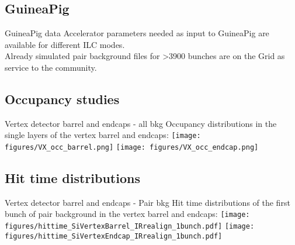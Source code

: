 \documentclass[xcolor={dvipsnames}]{beamer}
\begin{document}
\subsection{GuineaPig}
\begin{frame}{GuineaPig data}
Accelerator parameters needed as input to GuineaPig are available for different ILC modes.\\
Already simulated pair background files for >3900 bunches are on the Grid as service to the community.\cite{Grid}\\
\end{frame}

\subsection{Occupancy studies}
\begin{frame}{Vertex detector barrel and endcaps - all bkg}
Occupancy distributions in the single layers of the vertex barrel and endcaps:
\texttt{[image: figures/VX\_occ\_barrel.png]}
\texttt{[image: figures/VX\_occ\_endcap.png]}
\end{frame}

\subsection{Hit time distributions}
\begin{frame}{Vertex detector barrel and endcaps - Pair bkg}
Hit time distributions of the first bunch of pair background in the vertex barrel and endcaps:
\texttt{[image: figures/hittime\_SiVertexBarrel\_IRrealign\_1bunch.pdf]}
\texttt{[image: figures/hittime\_SiVertexEndcap\_IRrealign\_1bunch.pdf]}
\end{frame}
\end{document}
